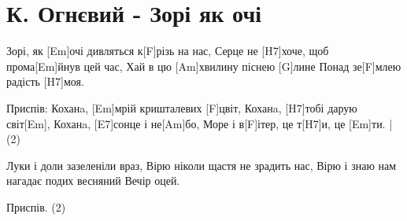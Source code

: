 \section{К. Огнєвий - Зорі як очі}
\begin{guitar}
Зорі, як [Em]очі дивляться к[F\guitarSharp]різь на нас,
Серце не [H7]хоче, щоб прома[Em]йнув цей час,
Хай в цю [Am]хвилину піснею [G]лине
Понад зе[F\guitarSharp]млею радість [H7]моя.


Приспів:
Коханa, [Em]мрій кришталевих [F\guitarSharp]цвіт,
Коханa, [H7]тобі дарую світ[Em],
Коханa, [E7]сонце і не[Am]бо,
Море і в[F\guitarSharp]ітер, це т[H7]и, це [Em]ти.  | (2)


Луки і доли зазеленіли враз,
Вірю ніколи щастя не зрадить нас,
Вірю і знаю нам нагадає подих весняний
Вечір оцей.

Приспів. (2)
\end{guitar}
